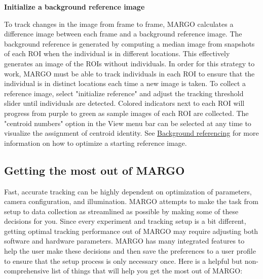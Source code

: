 \documentclass[11pt]{article}
\begin{document}
\fontsize{10}{0}
\textbf{Initialize a background reference image}

To track changes in the image from frame to frame, MARGO calculates a difference image between each frame and a background reference image. The background reference is generated by computing a median image from snapshots of each ROI when the individual is in different locations. This effectively generates an image of the ROIs without individuals. In order for this strategy to work, MARGO must be able to track individuals in each ROI to ensure that the individual is in distinct locations each time a new image is taken. To collect a reference image, select "initialize reference" and adjust the tracking threshold slider until individuals are detected. Colored indicators next to each ROI will progress from purple to green as sample images of each ROI are collected. The "centroid numbers" option in the View menu bar can be selected at any time to visualize the assignment of centroid identity. See \hyperlink{initializeref}{Background referencing} for more information on how to optimize a starting reference image.

\subsection{Getting the most out of MARGO}

Fast, accurate tracking can be highly dependent on optimization of parameters, camera configuration, and illumination. MARGO attempts to make the task from setup to data collection as streamlined as possible by making some of these decisions for you. Since every experiment and tracking setup is a bit different, getting optimal tracking performance out of MARGO may require adjusting both software and hardware parameters. MARGO has many integrated features to help the user make these decisions and then save the preferences to a user profile to ensure that the setup process is only necessary once. Here is a helpful but non-comprehensive list of things that will help you get the most out of MARGO: 
\end{document}
